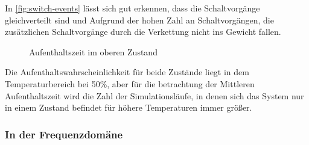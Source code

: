 \documentclass[main.tex]{subfiles}
\begin{document}
In \cref{fig:switch-events} lässt sich gut erkennen, dass die Schaltvorgänge gleichverteilt sind und Aufgrund der hohen Zahl an Schaltvorgängen, die zusätzlichen Schaltvorgänge durch die Verkettung nicht ins Gewicht fallen.

\begin{figure}[H]
    \centering
    \caption{Aufenthaltszeit im oberen Zustand}\label{fig:temp-up-percentage}
\end{figure}

Die Aufenthaltswahrscheinlichkeit für beide Zustände liegt in dem Temperaturbereich bei 50\%, aber für die betrachtung der Mittleren Aufenthaltszeit wird die Zahl der Simulationsläufe, in denen sich das System nur in einem Zustand befindet für höhere Temperaturen immer größer.

\subsubsection{In der Frequenzdomäne}
\end{document}
